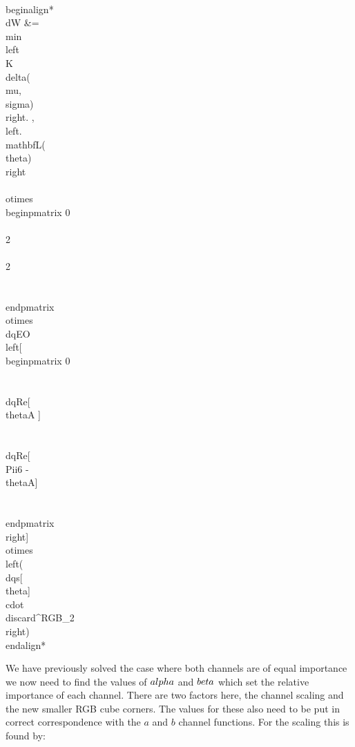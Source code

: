 \\begin{align*}
\\dW    &=  \\min\\left\\{K \\delta(\\mu,\\sigma) \\right. ,  \\left. \\mathbf{L}(\\theta) \\right\\} 
 \\otimes 
        \\begin{pmatrix}  0   \\\\   2   \\\\  2    \\\\ \\end{pmatrix} 
  \\otimes
        \\dqEO\\left[   \\begin{pmatrix}  0   \\\\ \\dqRe[ \\thetaA ]  \\\\ \\dqRe[ \\Pii{6} -\\thetaA]   \\\\ \\end{pmatrix}  \\right]
 \\otimes
        \\left( \\dqs[\\theta]  \\cdot \\discard^{RGB}_2 \\right) 
\\end{align*}

We have previously solved the case where both channels are of equal importance we now need to find the values of $\\alpha$ and $\\beta$ which set the relative importance of each channel. There are two factors here, the channel scaling and the new smaller RGB cube corners. The values for these also need to be put in correct correspondence with the $a$ and $b$ channel functions. For the scaling this is found by:

